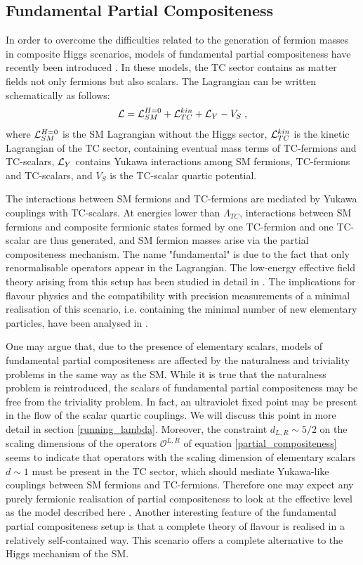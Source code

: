 \subsection{Fundamental Partial Compositeness}
\label{fundamental_partial_compositeness}

In order to overcome the difficulties related to the generation of fermion masses in composite Higgs scenarios, models of fundamental partial compositeness have recently been introduced \cite{Sannino:2016sfx}. In these models, the TC sector contains as matter fields not only fermions but also scalars. The Lagrangian can be written schematically as follows:
\begin{equation}
\mathcal L = \mathcal L_{SM}^{H=0} + \mathcal L_{TC}^{kin} + \mathcal L_Y -V_S \; ,
\end{equation}
%
where $\mathcal L_{SM}^{H=0}$ is the SM Lagrangian without the  Higgs sector, $\mathcal L_{TC}^{kin}$ is the kinetic Lagrangian of the TC sector, containing eventual mass terms of TC-fermions and TC-scalars, $ \mathcal L_Y$ contains Yukawa interactions among SM fermions, TC-fermions and TC-scalars, and $V_S$ is the TC-scalar quartic potential.

The interactions between SM fermions and TC-fermions are mediated by Yukawa couplings with TC-scalars. At energies lower than $\Lambda_{TC}$,  interactions between SM fermions and composite fermionic states formed by one TC-fermion and one TC-scalar are thus generated, and  SM fermion masses arise via the partial compositeness mechanism. The name "fundamental" is due to the fact that only renormalisable operators appear in the Lagrangian.
The low-energy effective field theory arising from this setup has been studied in detail in \cite{Cacciapaglia:2017cdi}. The implications for flavour physics and the compatibility with precision measurements of a minimal realisation of this scenario, i.e. containing the minimal number of new elementary particles, have been analysed in \cite{Sannino:2017utc}. 

One may argue that, due to the presence of elementary scalars, models of fundamental partial compositeness are affected by the naturalness and triviality problems in the same way as the SM. While it is true that the naturalness problem is reintroduced, the scalars of fundamental partial compositeness may be free from the triviality problem. In fact, an ultraviolet fixed point may be present in the flow  of the scalar quartic couplings. We will discuss this point in more detail in section \ref{running_lambda}. Moreover, the constraint $d_{L,R} \sim 5/2$ on the scaling dimensions of the operators $\mathcal O^{L,R}$ of equation \ref{partial_compositeness} seems to indicate that operators with the scaling dimension of elementary scalars $d \sim 1$ must be present in the TC sector, which should mediate Yukawa-like couplings between SM fermions and TC-fermions. Therefore one may expect any purely fermionic realisation of partial compositeness to look at the effective level as the model described here \cite{Sannino:2016sfx} . Another interesting feature of the fundamental partial compositeness setup is that a complete theory of flavour is realised in a relatively self-contained way. This scenario offers a complete alternative to the Higgs mechanism of the SM.

